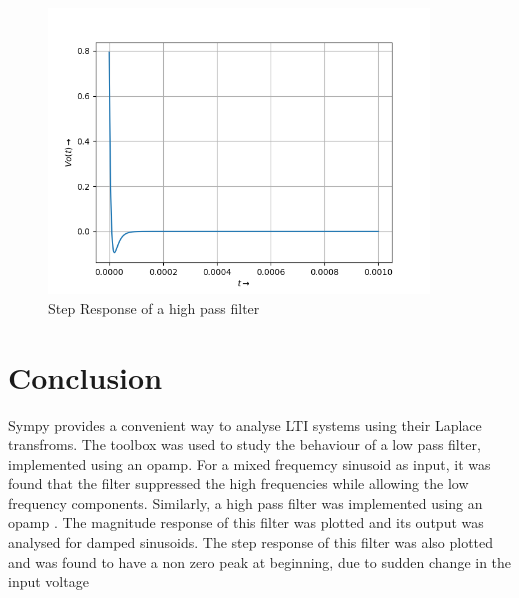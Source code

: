 \documentclass[10pt,a4paper]{article}
\begin{document}
\begin{figure}[!tbh]

\includegraphics[width = 0.9\textwidth]{high pass filter step response.png}
\caption{Step Response of a high pass filter}

\end{figure}

\section{Conclusion}

Sympy provides a convenient way to analyse LTI systems using their Laplace transfroms. The toolbox was used to study the behaviour of a low pass filter, implemented using an opamp. For a mixed frequemcy sinusoid as input, it was found that the filter suppressed the high frequencies while allowing the low frequency components. Similarly, a high pass filter was implemented using an opamp . The magnitude response of this filter was plotted and its output was analysed for damped sinusoids. The step response of this filter was also plotted and was found to have a non zero peak at beginning, due to sudden change in the input voltage
\end{document}
